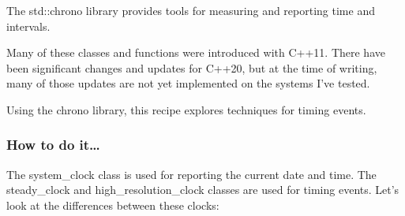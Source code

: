 
The std::chrono library provides tools for measuring and reporting time and intervals.

Many of these classes and functions were introduced with C++11. There have been significant changes and updates for C++20, but at the time of writing, many of those updates are not yet implemented on the systems I've tested.

Using the chrono library, this recipe explores techniques for timing events.

\subsubsection{How to do it…}

The system\_clock class is used for reporting the current date and time. The steady\_clock and high\_resolution\_clock classes are used for timing events. Let's look at the differences between these clocks:

